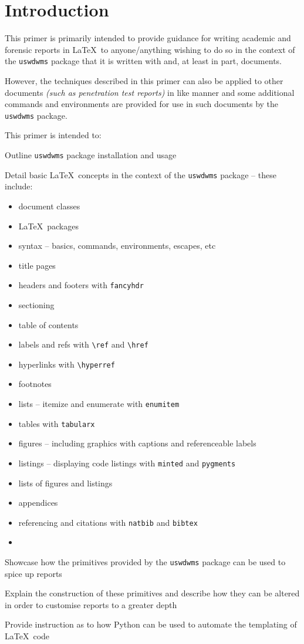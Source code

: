 \section{Introduction}
This primer is primarily intended to provide guidance for writing academic and forensic reports in \LaTeX\ to anyone/anything wishing to do so in the context of the \texttt{uswdwms} package that it is written with and, at least in part, documents.

However, the techniques described in this primer can also be applied to other documents \textit{(such as penetration test reports)} in like manner and some additional commands and environments are provided for use in such documents by the \texttt{uswdwms} package.

This primer is intended to:
\begin{methodology0}
  \item Outline \texttt{uswdwms} package installation and usage
  \item Detail basic \LaTeX\ concepts in the context of the \texttt{uswdwms} package -- these include:
    \begin{itemize}
      \item document classes
      \item \LaTeX\ packages
      \item syntax -- basics, commands, environments, escapes, etc
      \item title pages
      \item headers and footers with \texttt{fancyhdr}
      \item sectioning
      \item table of contents
      \item labels and refs with \texttt{\textbackslash ref} and \texttt{\textbackslash href}
      \item hyperlinks with \texttt{\textbackslash hyperref}
      \item footnotes
      \item lists -- itemize and enumerate with \texttt{enumitem}
      \item tables with \texttt{tabularx}
      \item figures -- including graphics with captions and referenceable labels
      \item listings -- displaying code listings with \texttt{minted} and \texttt{pygments}
      \item lists of figures and listings
      \item appendices
      \item referencing and citations with \texttt{natbib} and \texttt{bibtex}
      \item {}
    \end{itemize}
  \item Showcase how the primitives provided by the \texttt{uswdwms} package can be used to spice up reports
  \item Explain the construction of these primitives and describe how they can be altered in order to customise reports to a greater depth
  \item Provide instruction as to how Python can be used to automate the templating of \LaTeX\ code
\end{methodology0}
